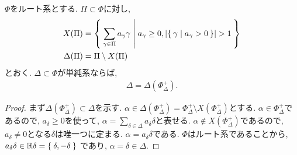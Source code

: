 \begin{lemma}
  \label{lem:simplesumissimplesystem:}
  $\Phi$をルート系とする.
  $\Pi\subset \Phi$に対し,
  \begin{align*}
    X(\Pi)&= \Set{\sum_{\gamma\in\Pi}a_\gamma\gamma| a_\gamma\geq 0, \numof{\Set{\gamma|a_\gamma>0}}>1}\\
    \Delta(\Pi)&= \Pi \setminus X(\Pi)
  \end{align*}
  とおく.
  $\Delta\subset \Phi$が単純系ならば,
  \begin{align*}
    \Delta=\Delta(\Phi_\Delta^+).
  \end{align*}
\end{lemma}
\begin{proof}
  まず$\Delta(\Phi_\Delta^{+})\subset \Delta$を示す.
  $\alpha\in \Delta(\Phi_\Delta^{+})=\Phi_\Delta^{+}\setminus X(\Phi_\Delta^{+})$とする.
  $\alpha\in \Phi_\Delta^{+}$であるので,
  $a_\delta \geq 0$を使って,
  $\alpha=\sum_{\delta\in\Delta}a_\delta \delta$と表せる.
  $\alpha\not\in X(\Phi_\Delta^{+})$であるので,
  $a_\delta\neq 0$となる$\delta$は唯一つに定まる.
  $\alpha = a_\delta \delta$である.
  $\Phi$はルート系であることから,
  $ a_\delta\delta \in \mathbb{R} \delta = \Set{\delta,-\delta}$
  であり, $\alpha=\delta\in \Delta$.



\end{proof}
